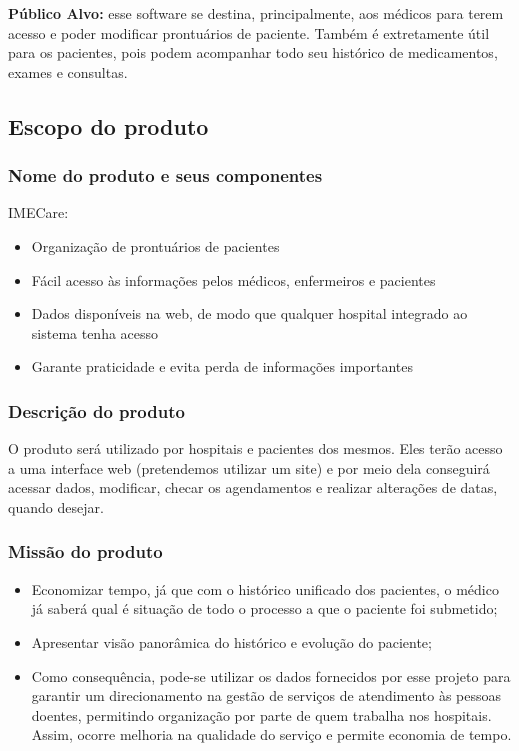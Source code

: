 \documentclass[12pt,a4paper]{report}
\begin{document}
\textbf{Público Alvo:} esse software se destina, principalmente, aos médicos para terem acesso e poder modificar prontuários de paciente. Também é extretamente útil para os pacientes, pois podem acompanhar todo seu histórico de medicamentos, exames e consultas.



\subsection{Escopo do produto}

\subsubsection{Nome do produto e seus componentes}
IMECare:

\begin{itemize}
\item Organização de prontuários de pacientes
\item Fácil acesso às informações pelos médicos, enfermeiros e pacientes
\item Dados disponíveis na web, de modo que qualquer hospital integrado ao sistema tenha acesso
\item Garante praticidade e evita perda de informações importantes 
\end{itemize}


\subsubsection{Descrição do produto}

O produto será utilizado por hospitais e pacientes dos mesmos. Eles terão acesso a uma interface web (pretendemos utilizar um site) e por meio dela conseguirá acessar dados, modificar, checar os agendamentos e realizar alterações de datas, quando desejar.



\subsubsection{Missão do produto}

\begin{itemize}

\item Economizar tempo, já que com o histórico unificado dos pacientes, o médico já saberá qual é situação de todo o processo a que o paciente foi submetido;
\item Apresentar visão panorâmica do histórico e evolução do paciente;
\item Como consequência, pode-se utilizar os dados fornecidos por esse projeto para garantir um direcionamento na gestão de serviços de atendimento às pessoas doentes, permitindo organização por parte de quem trabalha nos hospitais. Assim, ocorre melhoria na qualidade do serviço e permite economia de tempo.

\end{itemize}
\end{document}
